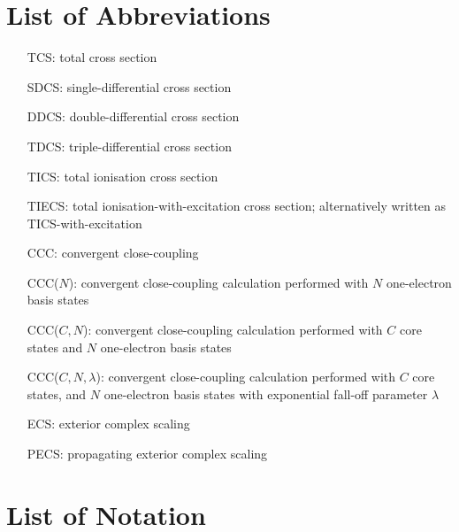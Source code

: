 \documentclass[]{article}
\begin{document}
\clearpage

\listoffigures

\clearpage

\listoftables

\clearpage

\section*{List of Abbreviations}

\begin{itemize}
\item[TCS:]
  total cross section
\item[SDCS:]
  single-differential cross section
\item[DDCS:]
  double-differential cross section
\item[TDCS:]
  triple-differential cross section
\item[TICS:]
  total ionisation cross section
\item[TIECS:]
  total ionisation-with-excitation cross section; alternatively written as
  TICS-with-excitation
\item[CCC:]
  convergent close-coupling
\item[CCC($N$):]
  convergent close-coupling calculation performed with $N$ one-electron basis
  states
\item[CCC($C, N$):]
  convergent close-coupling calculation performed with $C$ core states and $N$
  one-electron basis states
\item[CCC($C, N, \lambda$):]
  convergent close-coupling calculation performed with $C$ core states, and $N$
  one-electron basis states with exponential fall-off parameter $\lambda$
\item[ECS:]
  exterior complex scaling
\item[PECS:]
  propagating exterior complex scaling
\end{itemize}

\clearpage

\section*{List of Notation}
\end{document}
